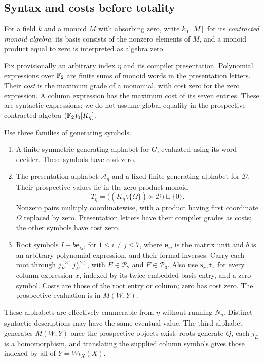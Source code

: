 \subsection{Syntax and costs before totality}

For a field $k$ and a monoid $M$ with absorbing zero, write $k_0[M]$ for its
\emph{contracted monoid algebra}: its basis consists of the nonzero
elements of $M$, and a monoid product equal to zero is interpreted
as algebra zero.

Fix provisionally an arbitrary index $\eta$ and its compiler
presentation.  Polynomial expressions over $\mathbb F_2$ are finite
sums of monoid words in the presentation letters.  Their
\emph{cost} is the maximum grade of a monomial, with cost zero
for the zero expression.  A column expression has the maximum
cost of its seven entries.  These are syntactic expressions:
we do not assume global equality in the prospective contracted
algebra $(\mathbb F_2)_0[K_\eta]$.

Use three families of generating symbols.
\begin{enumerate}[label=\textup{(\alph*)}]
\item A finite symmetric generating alphabet for $G$, evaluated
  using its word decider.  These symbols have cost zero.
\item The presentation alphabet $\mathcal A_\eta$ and a fixed
  finite generating alphabet for $\mathcal D$.  Their prospective
  values lie in the zero-product monoid
  \begin{equation}\label{eq:zero-product-monoid}
   T_\eta=\bigl((K_\eta\setminus\{\Omega\})\times\mathcal D\bigr)
          \sqcup\{0\}.
  \end{equation}
  Nonzero pairs multiply coordinatewise, with a product having
  first coordinate $\Omega$ replaced by zero.  Presentation
  letters have their compiler grades as costs; the other
  symbols have cost zero.
\item Root symbols $I+b\mathbf e_{ij}$, for $1\leq i\ne j\leq7$,
  where $\mathbf e_{ij}$ is the matrix unit and $b$ is an arbitrary
  polynomial expression, and their formal inverses.
  Carry each root through $j_F^{(3)}j_E^{(2)}$, with
  $E\in\mathcal P_2$ and $F\in\mathcal P_3$.
  Also use $\mathsf s_x,\mathsf t_x$ for every column expression
  $x$, indexed by its twice embedded basis entry, and a zero
  symbol.  Costs are those of the root entry or column;
  zero has cost zero.  The prospective evaluation is in $M(W,Y)$.
\end{enumerate}
These alphabets are effectively enumerable from $\eta$ without
running $N_\eta$.  Distinct syntactic descriptions may have the
same eventual value.  The third alphabet generates $M(W,Y)$
once the prospective objects exist: roots generate $Q$, each
$j_E$ is a homomorphism, and translating the supplied column
symbols gives those indexed by all of $Y=W\iota_X(X)$.


